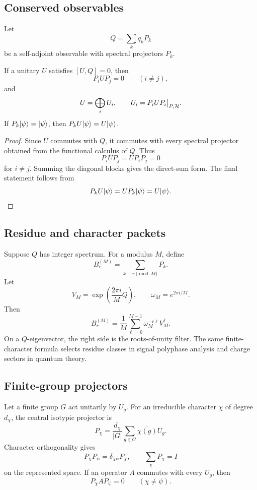 \subsection{Conserved observables}
Let
\[
Q=\sum_k q_kP_k
\]
be a self-adjoint observable with spectral projectors $P_k$.

\begin{theorem}
\label{s:thm:invariant-packets}
If a unitary $U$ satisfies $[U,Q]=0$, then
\[
P_iUP_j=0\qquad(i\neq j),
\]
and
\[
U=\bigoplus_i U_i,
\qquad
U_i=P_iUP_i\big|_{P_i\mathcal H}.
\]
If $P_k\lvert \psi\rangle=\lvert \psi\rangle$, then $P_kU\lvert \psi\rangle=U\lvert \psi\rangle$.
\end{theorem}

\begin{proof}
Since $U$ commutes with $Q$, it commutes with every spectral projector obtained from the functional calculus of $Q$. Thus
\[
P_iUP_j=UP_iP_j=0
\]
for $i\neq j$. Summing the diagonal blocks gives the direct-sum form. The final statement follows from
\[
P_kU\lvert \psi\rangle=UP_k\lvert \psi\rangle=U\lvert \psi\rangle.
\]
\end{proof}

\subsection{Residue and character packets}
Suppose $Q$ has integer spectrum. For a modulus $M$, define
\[
B_r^{(M)}=
\sum_{k\equiv r\pmod M}P_k.
\]
Let
\[
V_M=\exp\left(\frac{2\pi i}{M}Q\right),
\qquad
\omega_M=e^{2\pi i/M}.
\]
Then
\begin{equation}
B_r^{(M)}
=
\frac1M\sum_{\ell=0}^{M-1}
\omega_M^{-r\ell}V_M^\ell.
\label{s:eq:residue-projector}
\end{equation}
On a $Q$-eigenvector, the right side is the roots-of-unity filter. The same finite-character formula selects residue classes in signal polyphase analysis and charge sectors in quantum theory.

\subsection{Finite-group projectors}
Let a finite group $G$ act unitarily by $U_g$. For an irreducible character $\chi$ of degree $d_\chi$, the central isotypic projector is
\begin{equation}
P_\chi
=
\frac{d_\chi}{|G|}
\sum_{g\in G}
\overline{\chi(g)}U_g.
\label{s:eq:character-projector}
\end{equation}
Character orthogonality gives
\[
P_\chi P_\psi=\delta_{\chi\psi}P_\chi,
\qquad
\sum_\chi P_\chi=I
\]
on the represented space. If an operator $A$ commutes with every $U_g$, then
\[
P_\chi A P_\psi=0
\qquad(\chi\neq\psi).
\]

